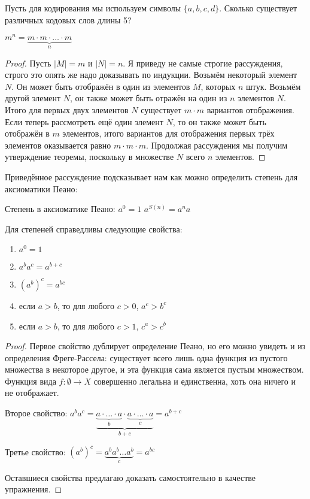 \begin{exercise}
Пусть для кодирования мы используем символы $\{a, b, c, d\}$. Сколько существует различных кодовых слов длины 5?
\end{exercise}

\begin{thm}
$m^n = \underbrace{m\cdot m \cdot \ldots \cdot m}_n$
\end{thm}
\begin{proof}
Пусть $|M| = m$ и $|N| = n$. Я приведу не самые строгие рассуждения, строго это опять же надо доказывать по индукции. Возьмём некоторый элемент $N$. Он может быть отображён в один из элементов $M$, которых $n$ штук. Возьмём другой элемент $N$, он также может быть отражён на один из $n$ элементов $N$. Итого для первых двух элементов $N$ существует $m\cdot m$ вариантов отображения. Если теперь рассмотреть ещё один элемент $N$, то он также может быть отображён в $m$ элементов, итого вариантов для отображения первых трёх элементов оказывается равно $m\cdot m\cdot m$. Продолжая рассуждения мы получим утверждение теоремы, поскольку в множестве $N$ всего $n$ элементов.
\end{proof}

Приведённое рассуждение подсказывает нам как можно определить степень для аксиоматики Пеано:

\begin{definition}
Степень в аксиоматике Пеано:\newline
$a^0 = 1$\newline
$a^{S(n)} = a^na$
\end{definition}

\begin{thm}
Для степеней справедливы следующие свойства:
\begin{enumerate}
\item $a^0 = 1$
\item $a^b a^c = a^{b+c}$
\item $(a^b)^c = a^{bc}$
\item если $a > b$, то для любого $c > 0$, $a^c > b^c$
\item если $a > b$, то для любого $c > 1$, $c^a > c^b$
\end{enumerate}
\end{thm}
\begin{proof}
Первое свойство дублирует определение Пеано, но его можно увидеть и из определения Фреге-Рассела: существует всего лишь одна функция из пустого множества в некоторое другое, и эта функция сама является пустым множеством. Функция вида $f:\emptyset\to X$ совершенно легальна и единственна, хоть она ничего и не отображает.

Второе свойство: $a^ba^c = \underbrace{\underbrace{a\cdot\ldots\cdot a}_b \cdot \underbrace{a \cdot\ldots \cdot a}_c}_{b+c} = a^{b+c}$

Третье свойство: $(a^b)^c = \underbrace{a^ba^b\ldots a^b}_c = a^{bc}$

Оставшиеся свойства предлагаю доказать самостоятельно в качестве упражнения.
\end{proof}

